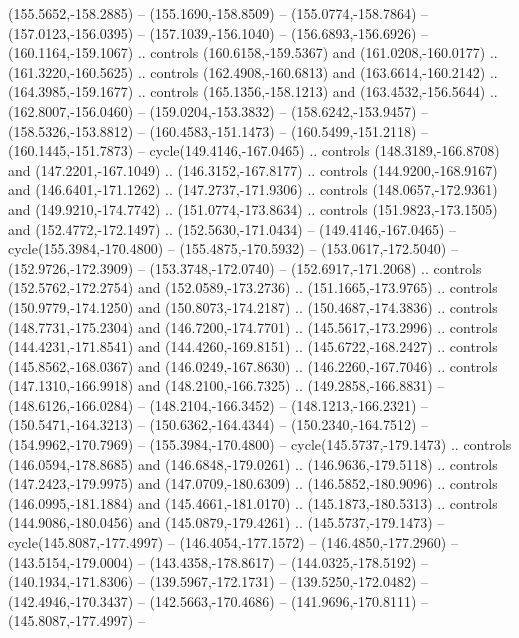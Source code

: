 \begin{scope}[cm={{1.25,0.0,0.0,-1.25,(0.0,442.91375)}}]
\begin{scope}[xscale=1.000,yscale=-1.000,fill=c545457,line join=miter,line cap=butt,line width=0.800pt]
      (155.5652,-158.2885) -- (155.1690,-158.8509) -- (155.0774,-158.7864) --
      (157.0123,-156.0395) -- (157.1039,-156.1040) -- (156.6893,-156.6926) --
      (160.1164,-159.1067) .. controls (160.6158,-159.5367) and (161.0208,-160.0177)
      .. (161.3220,-160.5625) .. controls (162.4908,-160.6813) and
      (163.6614,-160.2142) .. (164.3985,-159.1677) .. controls (165.1356,-158.1213)
      and (163.4532,-156.5644) .. (162.8007,-156.0460) -- (159.0204,-153.3832) --
      (158.6242,-153.9457) -- (158.5326,-153.8812) -- (160.4583,-151.1473) --
      (160.5499,-151.2118) -- (160.1445,-151.7873) -- cycle(149.4146,-167.0465) ..
      controls (148.3189,-166.8708) and (147.2201,-167.1049) .. (146.3152,-167.8177)
      .. controls (144.9200,-168.9167) and (146.6401,-171.1262) ..
      (147.2737,-171.9306) .. controls (148.0657,-172.9361) and (149.9210,-174.7742)
      .. (151.0774,-173.8634) .. controls (151.9823,-173.1505) and
      (152.4772,-172.1497) .. (152.5630,-171.0434) -- (149.4146,-167.0465) --
      cycle(155.3984,-170.4800) -- (155.4875,-170.5932) -- (153.0617,-172.5040) --
      (152.9726,-172.3909) -- (153.3748,-172.0740) -- (152.6917,-171.2068) ..
      controls (152.5762,-172.2754) and (152.0589,-173.2736) .. (151.1665,-173.9765)
      .. controls (150.9779,-174.1250) and (150.8073,-174.2187) ..
      (150.4687,-174.3836) .. controls (148.7731,-175.2304) and (146.7200,-174.7701)
      .. (145.5617,-173.2996) .. controls (144.4231,-171.8541) and
      (144.4260,-169.8151) .. (145.6722,-168.2427) .. controls (145.8562,-168.0367)
      and (146.0249,-167.8630) .. (146.2260,-167.7046) .. controls
      (147.1310,-166.9918) and (148.2100,-166.7325) .. (149.2858,-166.8831) --
      (148.6126,-166.0284) -- (148.2104,-166.3452) -- (148.1213,-166.2321) --
      (150.5471,-164.3213) -- (150.6362,-164.4344) -- (150.2340,-164.7512) --
      (154.9962,-170.7969) -- (155.3984,-170.4800) -- cycle(145.5737,-179.1473) ..
      controls (146.0594,-178.8685) and (146.6848,-179.0261) .. (146.9636,-179.5118)
      .. controls (147.2423,-179.9975) and (147.0709,-180.6309) ..
      (146.5852,-180.9096) .. controls (146.0995,-181.1884) and (145.4661,-181.0170)
      .. (145.1873,-180.5313) .. controls (144.9086,-180.0456) and
      (145.0879,-179.4261) .. (145.5737,-179.1473) -- cycle(145.8087,-177.4997) --
      (146.4054,-177.1572) -- (146.4850,-177.2960) -- (143.5154,-179.0004) --
      (143.4358,-178.8617) -- (144.0325,-178.5192) -- (140.1934,-171.8306) --
      (139.5967,-172.1731) -- (139.5250,-172.0482) -- (142.4946,-170.3437) --
      (142.5663,-170.4686) -- (141.9696,-170.8111) -- (145.8087,-177.4997) --

\end{scope}
\end{scope}
